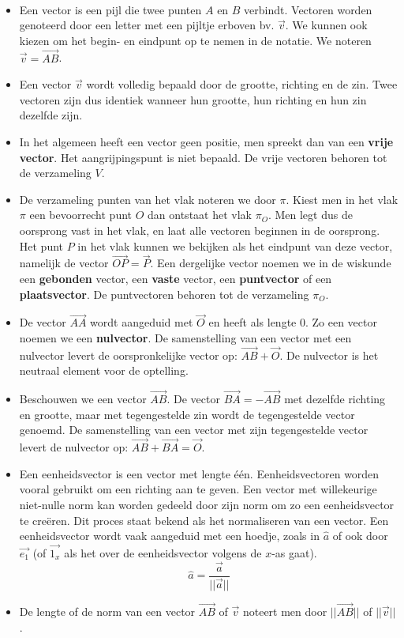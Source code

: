\begin{opmerking}
	\ \\
\begin{itemize}
	\item Een vector is een pijl die twee punten $A$ en $B$ verbindt. Vectoren worden genoteerd door een letter met een pijltje erboven bv. $\vec{v}$. We kunnen ook kiezen om het begin- en eindpunt op te nemen in de notatie. We noteren $\vec{v}=\vec{AB}$.
	\item Een vector $\vec{v}$ wordt volledig bepaald door de grootte, richting en de zin. Twee vectoren zijn dus identiek wanneer hun grootte, hun richting en hun zin dezelfde zijn.
	\item In het algemeen heeft een vector geen positie, men spreekt dan van een \textbf{vrije vector}. Het aangrijpingspunt is niet bepaald. De vrije vectoren behoren tot de verzameling $V$.
	\item De verzameling punten van het vlak noteren we door $\pi$. Kiest men in het vlak $\pi$ een bevoorrecht punt $O$ dan ontstaat het vlak $\pi_O$. Men legt dus de oorsprong  vast in het vlak, en laat alle vectoren beginnen in de oorsprong. Het punt $P$ in het vlak kunnen we bekijken als het eindpunt van deze vector, namelijk de vector $\vec{OP}=\vec{P}$. Een dergelijke vector noemen we in de wiskunde een \textbf{gebonden} vector, een \textbf{vaste} vector, een \textbf{puntvector} of een \textbf{plaatsvector}. De puntvectoren behoren tot de verzameling $\pi_O$.
	\item De vector $\vec{AA}$ wordt aangeduid met $\vec{O}$ en heeft als lengte 0. Zo een vector noemen we een \textbf{nulvector}. De samenstelling van een vector met een nulvector levert de oorspronkelijke vector op: $\vec{AB}+\vec{O}$. De nulvector is het neutraal element voor de optelling.
	\item Beschouwen we een vector $\vec{AB}$. De vector $\vec{BA}=-\vec{AB}$ met dezelfde richting en grootte, maar met tegengestelde zin wordt de tegengestelde vector genoemd. De samenstelling van een vector met zijn tegengestelde vector levert de nulvector op: $\vec{AB}+\vec{BA}=\vec{O}$.
	\item Een eenheidsvector is een vector met lengte \'e\'en. Eenheidsvectoren worden vooral gebruikt om een richting aan te geven. Een vector met willekeurige niet-nulle norm kan worden gedeeld door zijn norm om zo een eenheidsvector te cre\"eren. Dit proces staat bekend als het normaliseren van een vector. Een eenheidsvector wordt vaak aangeduid met een hoedje, zoals in $\hat{a}$  of ook door $\vec{e_1}$ (of $\vec{1_x}$ als het over de eenheidsvector volgens de $x$-as gaat).
	\begin{equation*}
	\hat{a} = \frac{\vec{a}}{||\vec{a}||}
	\end{equation*}
	\item De lengte of de norm van een vector $\vec{AB}$ of $\vec{v}$ noteert men door $||\vec{AB}||$ of $||\vec{v}||$.
\end{itemize}	
\end{opmerking}

